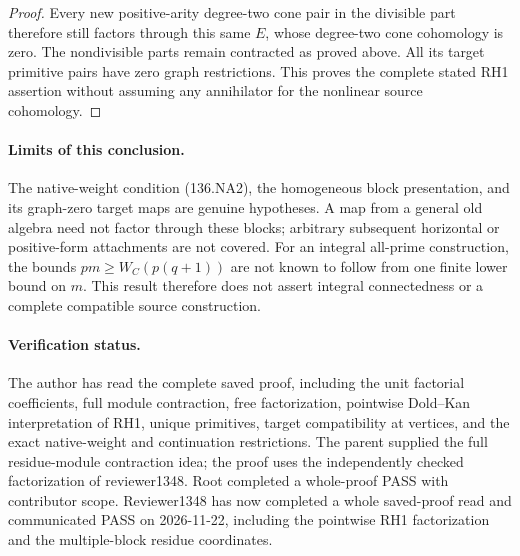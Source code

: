 \begin{proof}
Every new positive-arity degree-two cone pair in the divisible
part therefore still factors through this same \(E\), whose
degree-two cone cohomology is zero. The nondivisible parts
remain contracted as proved above. All its target primitive
pairs have zero graph restrictions. This proves the complete
stated RH1 assertion without assuming any annihilator for
the nonlinear source cohomology.
\end{proof}

\paragraph{Limits of this conclusion.}
The native-weight condition (136.NA2), the homogeneous block
presentation, and its graph-zero target maps are genuine
hypotheses. A map from a general old algebra need not factor
through these blocks; arbitrary subsequent horizontal or
positive-form attachments are not covered. For an integral
all-prime construction, the bounds
\(pm\geq W_C(p(q+1))\) are not known to follow from one
finite lower bound on \(m\). This result therefore does
not assert integral connectedness or a complete compatible
source construction.

\paragraph{Verification status.}
The author has read the complete saved proof, including the
unit factorial coefficients, full module contraction, free
factorization, pointwise Dold--Kan interpretation of RH1,
unique primitives, target compatibility at vertices, and
the exact native-weight and continuation restrictions.
The parent supplied the full residue-module contraction idea;
the proof uses the independently checked factorization of
reviewer1348. Root completed a whole-proof PASS with contributor scope.
Reviewer1348 has now completed a whole saved-proof read and
communicated PASS on 2026-11-22, including the pointwise RH1
factorization and the multiple-block residue coordinates.

